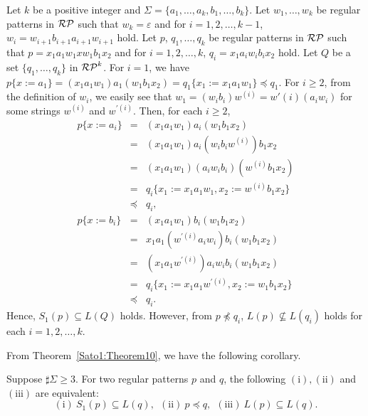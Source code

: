 \begin{ex}\label{counter-example4Theorem10}
    Let $k$ be a positive integer and $\Sigma= \{a_{1},\ldots,a_{k},b_{1},\ldots,b_{k}\}$.
    Let $w_{1},\ldots,w_{k}$ be regular patterns in $\mathcal{RP}$ such that 
    $w_{k} = \varepsilon$ and for $i=1,2,\ldots,k-1$, $w_{i} = w_{i+1}b_{i+1}a_{i+1}w_{i+1}$ hold.
    Let $p$, $q_{1},\ldots,q_{k}$ be regular patterns in $\mathcal{RP}$ such that
    $p = x_{1}a_{1}w_{1}xw_{1}b_{1}x_{2}$ and  for $i=1,2,\ldots,k$, $q_{i} = x_{1}a_{i}w_{i}b_{i}x_{2}$ hold.
    Let $Q$ be a set $\{q_{1},\ldots,q_{k}\}$ in $\mathcal{RP}^{k}$.
    For $i=1$, we have $p\{x:=a_{1}\} =(x_{1}a_{1}w_{1})a_{1}(w_{1}b_{1}x_{2})=q_1\{x_{1}:=x_{1}a_{1}w_{1}\}\preceq q_{1}$.
    For $i\geq 2$, from the definition of $w_{i}$,
    we easily see that $w_{1}=(w_{i}b_{i})w^{(i)}=w{'(i)}(a_{i}w_{i})$ for some strings $w^{(i)}$ and $w^{'(i)}$.
    Then, for each $i\geq 2$, 
    \begin{eqnarray*}
        p \{ x:=a_{i} \} & = & (x_{1}a_{1}w_{1})a_{i}(w_{1}b_{1}x_{2})\\
        & = & (x_{1}a_{1}w_{1})a_{i}(w_{i}b_{i}w^{(i)})b_{1}x_{2}\\
        & = & (x_{1}a_{1}w_{1})(a_{i}w_{i}b_{i})(w^{(i)}b_{1}x_{2})\\
        & = & q_{i} \{ x_{1} := x_{1}a_{1}w_{1}, x_{2} := w^{(i)}b_{1}x_{2} \}\\
        & \preceq & q_{i},\\
        p \{ x:=b_{i} \} & = & (x_{1}a_{1}w_{1})b_{i}(w_{1}b_{1}x_{2})\\
        & = & x_{1}a_{1}(w^{\prime (i)}a_{i}w_{i})b_{i}(w_{1}b_{1}x_{2}) \\
        & = & (x_{1}a_{1}w^{\prime (i)})a_{i}w_{i}b_{i}(w_{1}b_{1}x_{2}) \\
        & = & q_{i} \{ x_{1} := x_{1}a_{1}w^{\prime (i)}, x_{2} := w_{1}b_{1}x_{2} \}\\
        & \preceq & q_{i}.
    \end{eqnarray*}
%
   Hence, $S_{1}(p) \subseteq L(Q)$ holds.
   However, from $p \not \preceq q_{i}$, $L(p) \not \subseteq L(q_{i})$ holds for each $i=1,2,\ldots,k$.
\end{ex}

From Theorem~\ref{Sato1:Theorem10},
we have the following corollary.
\begin{col}
    Suppose $\sharp\Sigma \geq 3$.
    For two regular patterns $p$ and $q$,
    the following $(\mathrm{i}), (\mathrm{ii})$ and $(\mathrm{iii})$ are equivalent:
    \[
        (\mathrm{i})\ S_{1}(p) \subseteq L(q),\ \
        (\mathrm{ii})\ p \preceq q,\ \
        (\mathrm{iii})\ L(p) \subseteq L(q).
    \]
\end{col}